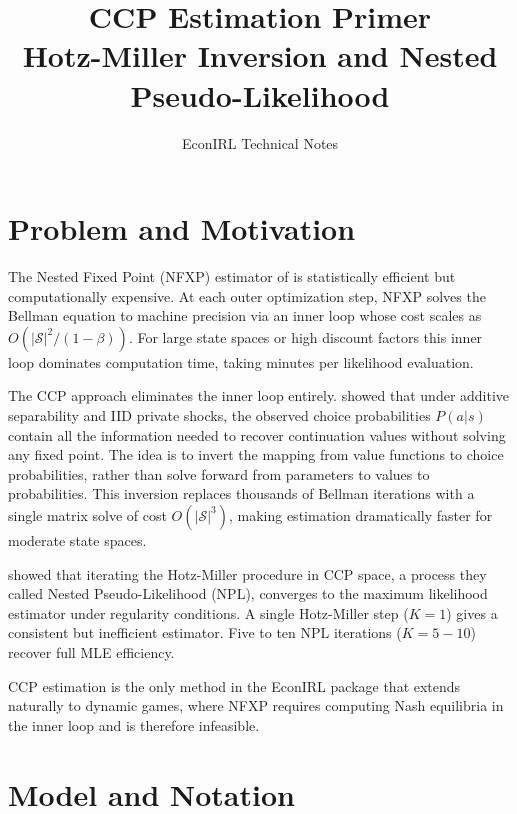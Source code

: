 \documentclass[11pt]{article}
\title{CCP Estimation Primer\\{\large Hotz-Miller Inversion and Nested Pseudo-Likelihood}}
\author{EconIRL Technical Notes}
\date{}
\begin{document}
\maketitle


\section{Problem and Motivation}

The Nested Fixed Point (NFXP) estimator of \citet{rust1987} is statistically efficient but computationally expensive. At each outer optimization step, NFXP solves the Bellman equation to machine precision via an inner loop whose cost scales as $O(|\mathcal{S}|^2 / (1-\beta))$. For large state spaces or high discount factors this inner loop dominates computation time, taking minutes per likelihood evaluation.

The CCP approach eliminates the inner loop entirely. \citet{hotzMiller1993} showed that under additive separability and IID private shocks, the observed choice probabilities $P(a|s)$ contain all the information needed to recover continuation values without solving any fixed point. The idea is to invert the mapping from value functions to choice probabilities, rather than solve forward from parameters to values to probabilities. This inversion replaces thousands of Bellman iterations with a single matrix solve of cost $O(|\mathcal{S}|^3)$, making estimation dramatically faster for moderate state spaces.

\citet{aguirregabiriaMira2002} showed that iterating the Hotz-Miller procedure in CCP space, a process they called Nested Pseudo-Likelihood (NPL), converges to the maximum likelihood estimator under regularity conditions. A single Hotz-Miller step ($K\!=\!1$) gives a consistent but inefficient estimator. Five to ten NPL iterations ($K\!=\!5{-}10$) recover full MLE efficiency.

CCP estimation is the only method in the EconIRL package that extends naturally to dynamic games, where NFXP requires computing Nash equilibria in the inner loop and is therefore infeasible.


\section{Model and Notation}
\end{document}
